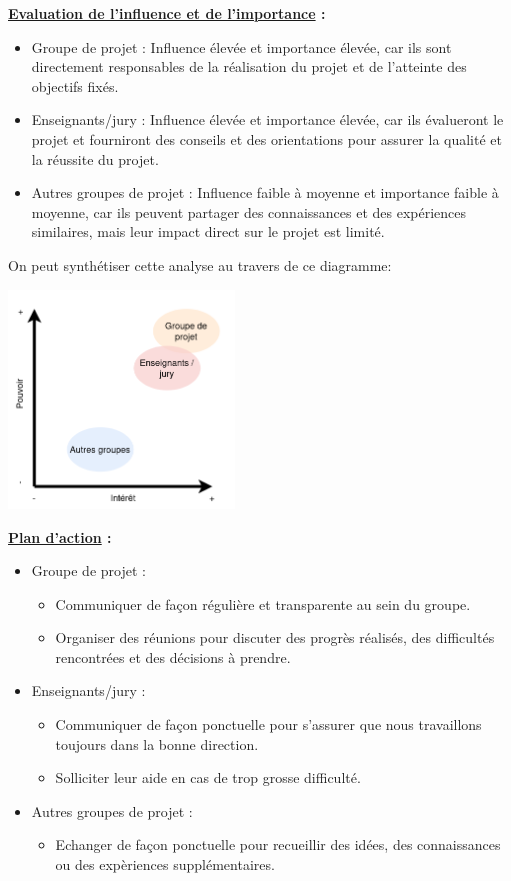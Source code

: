 \documentclass[a4paper, 12pt]{report}
\begin{document}
\textbf{\underline{Evaluation de l'influence et de l'importance} :}
\begin{itemize}
    \item Groupe de projet : Influence élevée et importance élevée, car ils sont directement responsables de la réalisation du projet et de l'atteinte des objectifs fixés.
    \item Enseignants/jury : Influence élevée et importance élevée, car ils évalueront le projet et fourniront des conseils et des orientations pour assurer la qualité et la réussite du projet.
    \item Autres groupes de projet : Influence faible à moyenne et importance faible à moyenne, car ils peuvent partager des connaissances et des expériences similaires, mais leur impact direct sur le projet est limité.
\end{itemize}
\bigskip

On peut synthétiser cette analyse au travers de ce diagramme:

\begin{center}
    \includegraphics[width = 0.45\textwidth]{IMG/parties_prenantes.png}
\end{center}

\textbf{\underline{Plan d'action} :}
\begin{itemize}
    \item Groupe de projet :
          \begin{itemize}
              \item Communiquer de façon régulière et transparente au sein du groupe.
              \item Organiser des réunions pour discuter des progrès réalisés, des difficultés rencontrées et des décisions à prendre.
          \end{itemize}
    \item Enseignants/jury :
          \begin{itemize}
              \item Communiquer de façon ponctuelle pour s'assurer que nous travaillons toujours dans la bonne direction.
              \item Solliciter leur aide en cas de trop grosse difficulté.
          \end{itemize}
    \item Autres groupes de projet :
          \begin{itemize}
              \item Echanger de façon ponctuelle pour recueillir des idées, des connaissances ou des expèriences supplémentaires.
          \end{itemize}
\end{itemize}
\end{document}
